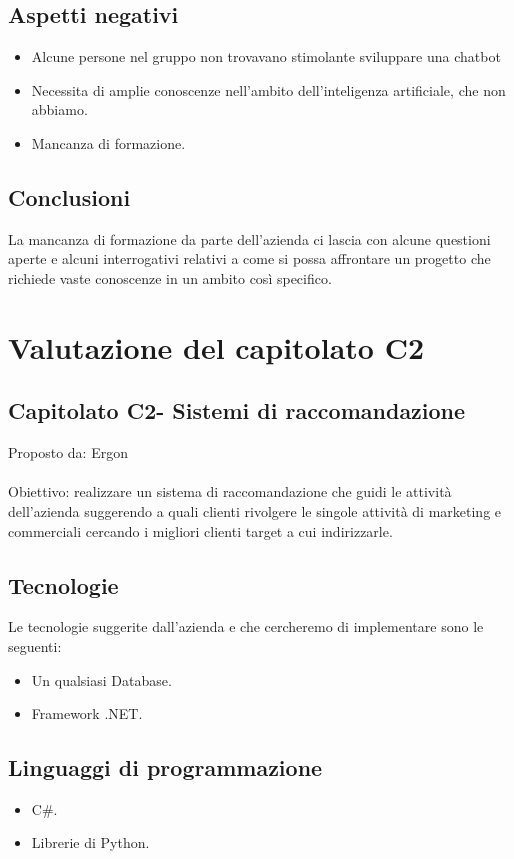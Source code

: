 \documentclass{article}
\begin{document}
\subsection{Aspetti negativi}
\begin{itemize}
    \item Alcune persone nel gruppo non trovavano stimolante sviluppare una chatbot
    \item Necessita di amplie conoscenze nell'ambito dell'inteligenza artificiale, che non abbiamo.
    \item Mancanza di formazione. 

\end{itemize}
\subsection{Conclusioni}
La mancanza di formazione da parte dell'azienda ci lascia con alcune questioni aperte e alcuni interrogativi relativi a come si possa affrontare un progetto che richiede vaste conoscenze in un ambito così specifico.

\section{Valutazione del capitolato C2}
\subsection{Capitolato C2- Sistemi di raccomandazione}
Proposto da: Ergon\\ \\
Obiettivo: realizzare un sistema di raccomandazione che guidi le attività dell'azienda suggerendo a quali clienti rivolgere le singole attività di marketing e commerciali cercando i migliori clienti target a cui indirizzarle.
\subsection{Tecnologie}
Le tecnologie suggerite dall’azienda e che cercheremo di implementare sono le seguenti:
\begin{itemize}
    \item Un qualsiasi Database.
    \item Framework .NET.
\end{itemize}
\subsection{Linguaggi di programmazione}
\begin{itemize}
    \item C\#.
    \item Librerie di Python.
\end{itemize}
\end{document}
